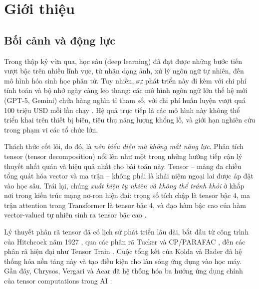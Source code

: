 \section{Giới thiệu}

\subsection{Bối cảnh và động lực}

Trong thập kỷ vừa qua, học sâu (deep learning) đã đạt được những bước tiến vượt bậc trên nhiều lĩnh vực, từ nhận dạng ảnh, xử lý ngôn ngữ tự nhiên, đến mô hình hóa sinh học phân tử. Tuy nhiên, sự phát triển này đi kèm với chi phí tính toán và bộ nhớ ngày càng leo thang: các mô hình ngôn ngữ lớn thế hệ mới (GPT-5, Gemini) chứa hàng nghìn tỉ tham số, với chi phí huấn luyện vượt quá 100 triệu USD mỗi lần chạy \cite{chrysos2025tutorial}. Hệ quả trực tiếp là các mô hình này không thể triển khai trên thiết bị biên, tiêu thụ năng lượng khổng lồ, và giới hạn nghiên cứu trong phạm vi các tổ chức lớn.

Thách thức cốt lõi, do đó, là \textit{nén biểu diễn mà không mất năng lực}. Phân tích tensor (tensor decomposition) nổi lên như một trong những hướng tiếp cận lý thuyết nhất quán và hiệu quả nhất cho bài toán này. Tensor -- mảng đa chiều tổng quát hóa vector và ma trận -- không phải là khái niệm ngoại lai được áp đặt vào học sâu. Trái lại, chúng \textit{xuất hiện tự nhiên và không thể tránh khỏi} ở khắp nơi trong kiến trúc mạng nơ-ron hiện đại: trọng số tích chập là tensor bậc 4, ma trận attention trong Transformer là tensor bậc 4, và đạo hàm bậc cao của hàm vector-valued tự nhiên sinh ra tensor bậc cao \cite{hillar2013most}.

Lý thuyết phân rã tensor đã có lịch sử phát triển lâu dài, bắt đầu từ công trình của Hitchcock năm 1927 \cite{hitchcock1927expression}, qua các phân rã Tucker \cite{tucker1966some} và CP/PARAFAC \cite{harshman1970foundations, carroll1970analysis}, đến các phân rã hiện đại như Tensor Train \cite{oseledets2011tensor}. Cuộc tổng kết của Kolda và Bader \cite{kolda2009tensor} đã hệ thống hóa nền tảng này và tạo điều kiện cho làn sóng ứng dụng vào học máy. Gần đây, Chrysos, Vergari và Acar đã hệ thống hóa ba hướng ứng dụng chính của tensor computations trong AI \cite{chrysos2025tutorial}:

